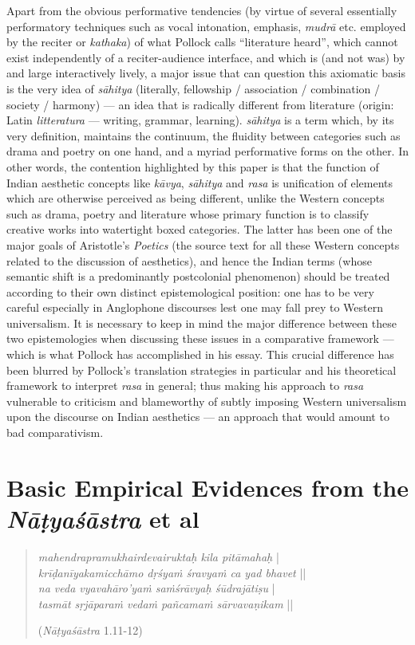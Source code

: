 Apart from the obvious performative tendencies (by virtue of several essentially performatory techniques such as vocal intonation, emphasis, \textsl{mudrā} etc. employed by the reciter or \textsl{kathaka}) of what Pollock calls “literature heard”, which cannot exist independently of a reciter-audience interface, and which is (and not was) by and large interactively lively, a major issue that can question this axiomatic basis is the very idea of \textsl{sāhitya} (literally, fellowship / association / combination / society / harmony) --- an idea that is radically different from literature (origin: Latin \textsl{litteratura} --- writing, grammar, learning). \textsl{sāhitya} is a term which, by its very definition, maintains the continuum, the fluidity between categories such as drama and poetry on one hand, and a myriad performative forms on the other. In other words, the contention highlighted by this paper is that the function of Indian aesthetic concepts like \textsl{kāvya}, \textsl{sāhitya} and \textsl{rasa} is unification of elements which are otherwise perceived as being different, unlike the Western concepts such as drama, poetry and literature whose primary function is to classify creative works into watertight boxed categories. The latter has been one of the major goals of Aristotle’s \textsl{Poetics} (the source text for all these Western concepts related to the discussion of aesthetics), and hence the Indian terms (whose semantic shift is a predominantly postcolonial phenomenon) should be treated according to their own distinct epistemological position: one has to be very careful especially in Anglophone discourses lest one may fall prey to Western universalism. It is necessary to keep in mind the major difference between these two epistemologies when discussing these issues in a comparative framework --- which is what Pollock has accomplished in his essay. This crucial difference has been blurred by Pollock’s translation strategies in particular and his theoretical framework to interpret \textsl{rasa} in general; thus making his approach to \textsl{rasa} vulnerable to criticism and blameworthy of subtly imposing Western universalism upon the discourse on Indian aesthetics --- an approach that would amount to bad comparativism.\\[-21pt]

\section*{Basic Empirical Evidences from the \textsl{Nāṭyaśāstra} et al}
\begin{quote}
\textsl{mahendrapramukhairdevairuktaḥ kila pitāmahaḥ} |\\
\textsl{krīḍanīyakamicchāmo dṛśyaṁ śravyaṁ ca yad bhavet} ||\\
\textsl{na veda vyavahāro’yaṁ saṁśrāvyaḥ śūdrajātiṣu} |\\
\textsl{tasmāt sṛjāparaṁ vedaṁ pañcamaṁ sārvavaṇikam} ||   

\hfill(\textsl{Nāṭyaśāstra} 1.11-12)  
\end{quote}

